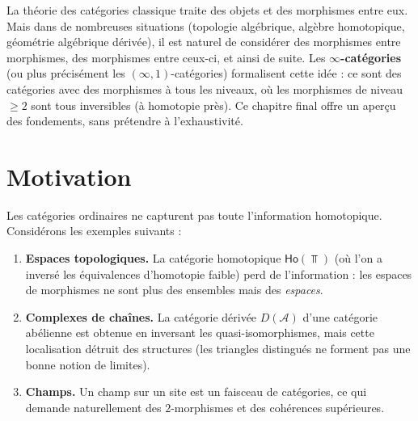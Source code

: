 \vspace{1em}

La théorie des catégories classique traite des objets et des morphismes
entre eux.  Mais dans de nombreuses situations (topologie algébrique,
algèbre homotopique, géométrie algébrique dérivée), il est naturel
de considérer des morphismes entre morphismes, des morphismes entre
ceux-ci, et ainsi de suite.  Les \textbf{$\infty$-catégories}
(ou plus précisément les $(\infty,1)$-catégories) formalisent cette
idée : ce sont des catégories avec des morphismes à tous les niveaux,
où les morphismes de niveau $\geq 2$ sont tous inversibles (à homotopie
près).  Ce chapitre final offre un aperçu des fondements, sans
prétendre à l'exhaustivité.


\section{Motivation}\label{sec:infty-motivation}

Les catégories ordinaires ne capturent pas toute l'information
homotopique.  Considérons les exemples suivants :

\begin{enumerate}[label=(\roman*)]
\item \textbf{Espaces topologiques.}
      La catégorie homotopique $\mathsf{Ho}(\Top)$ (où l'on a inversé
      les équivalences d'homotopie faible) perd de l'information :
      les espaces de morphismes ne sont plus des ensembles mais des
      \emph{espaces}.

\item \textbf{Complexes de chaînes.}
      La catégorie dérivée $D(\mathcal{A})$ d'une catégorie abélienne
      est obtenue en inversant les quasi-isomorphismes, mais cette
      localisation détruit des structures (les triangles distingués
      ne forment pas une bonne notion de limites).

\item \textbf{Champs.}
      Un champ sur un site est un \og faisceau de catégories\fg{}, ce
      qui demande naturellement des $2$-morphismes et des cohérences
      supérieures.
\end{enumerate}

